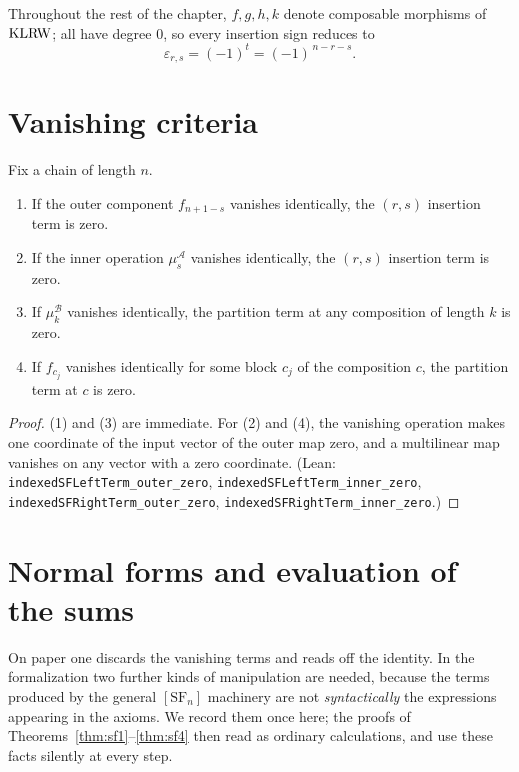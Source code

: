 Throughout the rest of the chapter, $f, g, h, k$ denote composable morphisms
of $\operatorname{KLRW}$; all have degree $0$, so every insertion sign reduces to
\[
  \varepsilon_{r,s} = (-1)^{t} = (-1)^{\,n-r-s}.
\]

\section{Vanishing criteria}

\begin{lemma}\label{lem:vanishing}
  Fix a chain of length $n$.
  \begin{enumerate}
    \item If the outer component $f_{n+1-s}$ vanishes identically, the
      $(r,s)$ insertion term is zero.
    \item If the inner operation $\mu^{\mathcal A}_s$ vanishes identically,
      the $(r,s)$ insertion term is zero.
    \item If $\mu^{\mathcal B}_k$ vanishes identically, the partition term at
      any composition of length $k$ is zero.
    \item If $f_{c_j}$ vanishes identically for some block $c_j$ of the
      composition $c$, the partition term at $c$ is zero.
  \end{enumerate}
\end{lemma}

\begin{proof}
  (1) and (3) are immediate. For (2) and (4), the vanishing operation makes
  one coordinate of the input vector of the outer map zero, and a multilinear
  map vanishes on any vector with a zero coordinate. (Lean:
  \texttt{indexedSFLeftTerm\_outer\_zero},
  \texttt{indexedSFLeftTerm\_inner\_zero},
  \texttt{indexedSFRightTerm\_outer\_zero},
  \texttt{indexedSFRightTerm\_inner\_zero}.)
\end{proof}

\section{Normal forms and evaluation of the sums}\label{sec:normal-forms}

On paper one discards the vanishing terms and reads off the identity. In the
formalization two further kinds of manipulation are needed, because the terms
produced by the general $[\mathrm{SF}_n]$ machinery are not
\emph{syntactically} the expressions appearing in the axioms. We record them
once here; the proofs of Theorems~\ref{thm:sf1}--\ref{thm:sf4} then read as
ordinary calculations, and use these facts silently at every step.

